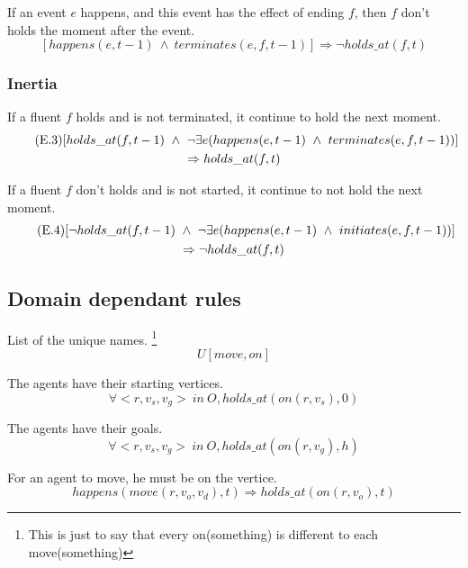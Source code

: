 If an event $e$ happens, and this event has the effect of ending $f$, then $f$ don't holds the moment after the event.
\begin{equation}
  \tag{E.2}
  [happens(e,t-1)\ \land\ terminates(e,f,t-1)] \Rightarrow \neg holds\_at(f,t)
\end{equation}

\subsubsection{Inertia}

If a fluent $f$ holds and is not terminated, it continue to hold the next moment.
\begin{multline}
  \tag{E.3}
$$[holds\_at(f,t-1)\ \land\ \neg\exists e(happens(e,t-1)\ \land\ terminates(e,f,t-1))] \\ \Rightarrow holds\_at(f,t)$$
\end{multline}

If a fluent $f$ don't holds and is not started, it continue to not hold the next moment.
\begin{multline}
  \tag{E.4}
$$[\neg holds\_at(f,t-1)\ \land\ \neg\exists e(happens(e,t-1)\ \land\ initiates(e,f,t-1))] \\ \Rightarrow\neg holds\_at(f,t)$$
\end{multline}

\subsection{Domain dependant rules}

List of the unique names. \footnote{This is just to say that every on(something) is different to each move(something)}
\begin{equation}
  \tag{$\Omega$}
  U[move,on]
\end{equation}

The agents have their starting vertices.
\begin{equation}
  \tag{$\Gamma_i$}
  \forall <r,v_s,v_g>\ in\ O,holds\_at(on(r,v_s),0)
\end{equation}

The agents have their goals.
\begin{equation}
  \tag{$\Gamma_f$}
  \forall <r,v_s,v_g>\ in\ O,holds\_at(on(r,v_g),h)
\end{equation}

For an agent to move, he must be on the vertice.
\begin{equation}
  \tag{$\Psi$.1}
  happens(move(r,v_o,v_d),t) \Rightarrow holds\_at(on(r,v_o),t)
\end{equation}

